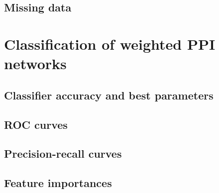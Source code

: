 


\subsection{Missing data}


\section{Classification of weighted PPI networks}

\subsection{Classifier accuracy and best parameters}



\subsection{ROC curves}




\subsection{Precision-recall curves}


\subsection{Feature importances}

